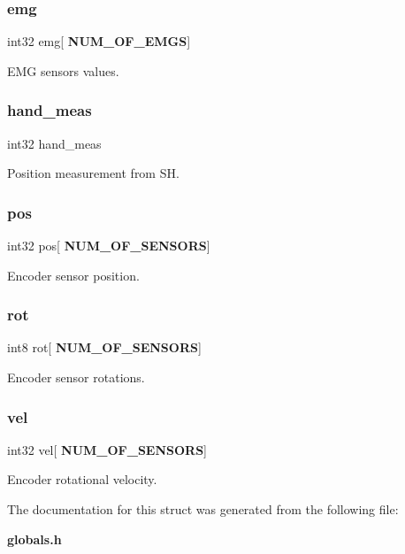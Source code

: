 \subsubsection{emg}
{\footnotesize\ttfamily int32 emg[\textbf{ N\+U\+M\+\_\+\+O\+F\+\_\+\+E\+M\+GS}]}

E\+MG sensors values. \mbox{\label{structst__meas_a2b868d93a8a34bb622e648b05a05068e}} 
\subsubsection{hand\+\_\+meas}
{\footnotesize\ttfamily int32 hand\+\_\+meas}

Position measurement from SH. \mbox{\label{structst__meas_a3ee4913e7257d25d3e47cbbada9c8546}} 
\subsubsection{pos}
{\footnotesize\ttfamily int32 pos[\textbf{ N\+U\+M\+\_\+\+O\+F\+\_\+\+S\+E\+N\+S\+O\+RS}]}

Encoder sensor position. \mbox{\label{structst__meas_a26b47db1884c475bc42d76a709349f97}} 
\subsubsection{rot}
{\footnotesize\ttfamily int8 rot[\textbf{ N\+U\+M\+\_\+\+O\+F\+\_\+\+S\+E\+N\+S\+O\+RS}]}

Encoder sensor rotations. \mbox{\label{structst__meas_a8ef1e0e837efdf852aa286d20625d6a1}} 
\subsubsection{vel}
{\footnotesize\ttfamily int32 vel[\textbf{ N\+U\+M\+\_\+\+O\+F\+\_\+\+S\+E\+N\+S\+O\+RS}]}

Encoder rotational velocity. 

The documentation for this struct was generated from the following file\+:\begin{DoxyCompactItemize}
\item 
\textbf{ globals.\+h}\end{DoxyCompactItemize}

